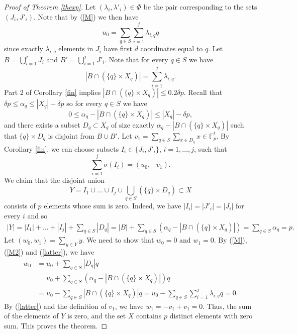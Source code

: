 \documentclass{daj}
\renewcommand{\le}{\leqslant}
\newcommand{\FF}{\mathbb F}
\theoremstyle{definition}
\theoremstyle{remark}
\theoremstyle{definition}
\theoremstyle{definition}
\begin{document}
\begin{proof}[Proof of Theorem \ref{thexp}]
Let $(\lambda_i, \lambda'_i) \in \Phi$ be the pair corresponding to the sets $(J_i, J'_i)$. Note that by (\ref{M}) we then have
\begin{equation}\label{M2}
    u_0 = \sum_{q \in S} \sum_{i=1}^j \lambda_{i, q} q
\end{equation}
since exactly $\lambda_{i, q}$ elements in $J_i$ have first $d$ coordinates equal to $q$.
Let $B = \bigcup_{i=1}^j J_i$ and $B' = \bigcup_{i=1}^j J'_i$. Note that for every $q\in S$ we have
\begin{equation}\label{M3}
    |B \cap (\{q\} \times X_q)| = \sum_{i=1}^j \lambda_{i,q}.
\end{equation}
Part 2 of Corollary \ref{fin} implies $|B \cap (\{q\} \times X_q)| \le 0.2 \delta p$. 
Recall that $\delta p \le \alpha_q \le |X_q| - \delta p$ so for every $q \in S$ we have 
$$
0 \le \alpha_q - |B \cap (\{q\}\times X_q)| \le |X_q| - \delta p,
$$
and there exists a subset $D_q \subset X_q$ of size exactly $\alpha_q - |B \cap (\{q\} \times X_q)|$ such that $\{q\} \times D_q$ is disjoint from $B \cup B'$. Let $v_1 = \sum_{q\in S} \sum_{x\in D_q} x \in \FF_p^t$. By Corollary \ref{fin}, we can choose subsets $I_i \in \{J_i, J'_i\}$, $i=1, \ldots, j$, such that
\begin{equation}\label{latter}
\sum_{i=1}^j \sigma(I_i) = (u_0, -v_1).    
\end{equation}
We claim that the disjoint union 
$$
Y = I_1 \cup \ldots \cup I_j \cup \bigcup_{q \in S} (\{q\}\times D_q) \subset X
$$
consists of $p$ elements whose sum is zero. Indeed, we have $|I_i| = |J'_i| = |J_i|$ for every $i$ and so
\begin{align*}
|Y| = |I_1| + \ldots + |I_j| + \sum_{q\in S} |D_q| = |B| + \sum_{q \in S} \left(\alpha_q - |B \cap (\{q\} \times X_q)|\right) = \sum_{q\in S} \alpha_q = p.
\end{align*}
Let $(w_0, w_1) = \sum_{y \in Y} y$. We need to show that $w_0 = 0$ and $w_1 = 0$. By (\ref{M}), (\ref{M2}) and (\ref{latter}), we have
\begin{align*}
w_0 &= u_0 + \sum_{q \in S} |D_q| q \\
&= u_0 + \sum_{q\in S} (\alpha_q - |B \cap (\{q\} \times X_q)|) q \\
&= u_0 - \sum_{q\in S} |B \cap (\{q\} \times X_q)| q = u_0 - \sum_{q\in S} \sum_{i=1}^j \lambda_{i,q} q = 0.
\end{align*}
By (\ref{latter}) and the definition of $v_1$, we have $w_1 = -v_1 + v_1 = 0$. Thus, the sum of the elements of $Y$ is zero, and the set $X$ contains $p$ distinct elements with zero sum. This proves the theorem.
\end{proof}
\end{document}
